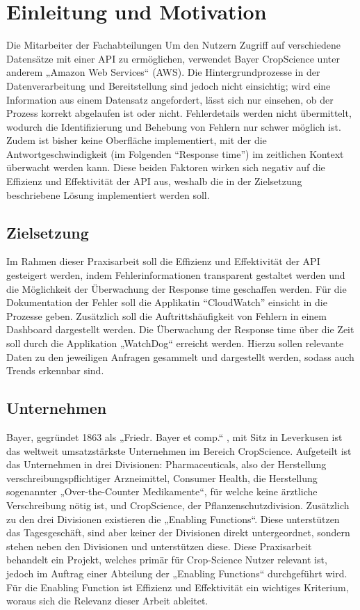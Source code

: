 \section{Einleitung und Motivation}
Die Mitarbeiter der Fachabteilungen 
Um den Nutzern Zugriff auf verschiedene Datensätze mit einer API zu ermöglichen, verwendet Bayer CropScience unter anderem „Amazon Web Services“ (AWS). Die Hintergrundprozesse in der Datenverarbeitung und Bereitstellung sind jedoch nicht einsichtig; wird eine Information aus einem Datensatz angefordert, lässt sich nur einsehen, ob der Prozess korrekt abgelaufen ist oder nicht. Fehlerdetails werden nicht übermittelt, wodurch die Identifizierung und Behebung von Fehlern nur schwer möglich ist. Zudem ist bisher keine Oberfläche implementiert, mit der die Antwortgeschwindigkeit (im Folgenden ``Response time'') im zeitlichen Kontext überwacht werden kann. Diese beiden Faktoren wirken sich negativ auf die Effizienz und Effektivität der API aus, weshalb die in der Zielsetzung beschriebene Lösung implementiert werden soll.
\subsection{Zielsetzung}
Im Rahmen dieser Praxisarbeit soll die Effizienz  und Effektivität  der API gesteigert werden, indem Fehlerinformationen transparent gestaltet werden und die Möglichkeit der Überwachung der Response time geschaffen werden. Für die Dokumentation der Fehler soll die Applikatin ``CloudWatch'' einsicht in die Prozesse geben. Zusätzlich soll die Auftrittshäufigkeit von Fehlern in einem Dashboard dargestellt werden. Die Überwachung der Response time über die Zeit soll durch die Applikation „WatchDog“ erreicht werden. Hierzu sollen relevante Daten zu den jeweiligen Anfragen gesammelt und dargestellt werden, sodass auch Trends erkennbar sind.
\subsection{Unternehmen}
Bayer, gegründet 1863 als „Friedr. Bayer et comp.“ , mit Sitz in Leverkusen ist das weltweit umsatzstärkste Unternehmen im Bereich CropScience. Aufgeteilt ist das Unternehmen in drei Divisionen: Pharmaceuticals, also der Herstellung verschreibungspflichtiger Arzneimittel, Consumer Health, die Herstellung sogenannter „Over-the-Counter Medikamente“, für welche keine ärztliche Verschreibung nötig ist, und CropScience, der Pflanzenschutzdivision. Zusätzlich zu den drei Divisionen existieren die „Enabling Functions“. Diese unterstützen das Tagesgeschäft, sind aber keiner der Divisionen direkt untergeordnet, sondern stehen neben den Divisionen und unterstützen diese. Diese Praxisarbeit behandelt ein Projekt, welches primär für Crop-Science Nutzer relevant ist, jedoch im Auftrag einer Abteilung der „Enabling Functions“ durchgeführt wird. Für die Enabling Function ist Effizienz und Effektivität ein wichtiges Kriterium, woraus sich die Relevanz dieser Arbeit ableitet.
